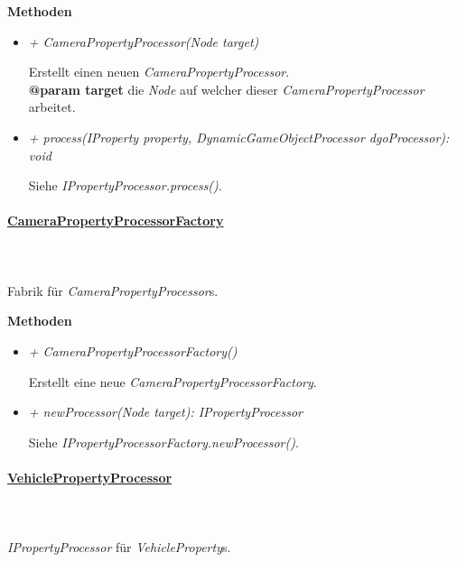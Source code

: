         \pagebreak
        \textbf{Methoden}
        \begin{itemize}
            \item \textit{+ CameraPropertyProcessor(Node target)}
                \begin{leftbar}[0.9\linewidth]
                    Erstellt einen neuen \textit{CameraPropertyProcessor}.\\
                    \textbf{@param target} die \textit{Node} auf welcher dieser \textit{CameraPropertyProcessor} arbeitet.
                \end{leftbar}
            \item \textit{+ process(IProperty property, DynamicGameObjectProcessor dgoProcessor): void}
                \begin{leftbar}[0.9\linewidth]
                    Siehe \textit{IPropertyProcessor.process()}.
                \end{leftbar}
        \end{itemize}

    \paragraph{\underline{CameraPropertyProcessorFactory}} \mbox{}\\
    \\
    Fabrik für \textit{CameraPropertyProcessor}s.\par

        \textbf{Methoden}
        \begin{itemize}
            \item \textit{+ CameraPropertyProcessorFactory()}
                \begin{leftbar}[0.9\linewidth]
                    Erstellt eine neue \textit{CameraPropertyProcessorFactory}.
                \end{leftbar}
            \item \textit{+ newProcessor(Node target): IPropertyProcessor}
                \begin{leftbar}[0.9\linewidth]
                    Siehe \textit{IPropertyProcessorFactory.newProcessor()}.
                \end{leftbar}
        \end{itemize}

    \paragraph{\underline{VehiclePropertyProcessor}} \mbox{}\\
    \\
    \textit{IPropertyProcessor} für \textit{VehicleProperty}s.\par

